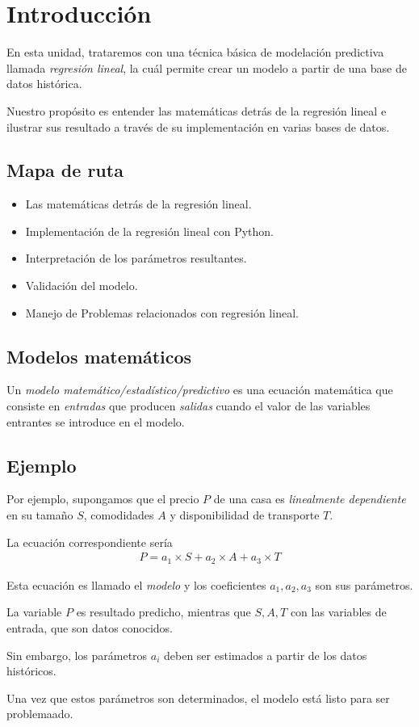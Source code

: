 \section{Introducción}

En esta unidad, trataremos con una técnica básica de modelación predictiva llamada \emph{regresión lineal}, la cuál permite crear un modelo a partir de una base de datos histórica.


Nuestro propósito es entender las matemáticas detrás de la regresión lineal e ilustrar sus resultado a través de su implementación en varias bases de datos.

\subsection{Mapa de ruta}
\begin{itemize}
	\item Las matemáticas detrás de la regresión lineal.
	\item Implementación de la regresión lineal con Python.
	\item Interpretación de los parámetros resultantes.
	\item Validación del modelo.
	\item Manejo de Problemas relacionados con regresión lineal.
\end{itemize}


\subsection{Modelos matemáticos}
Un \emph{modelo matemático/estadístico/predictivo} es una ecuación matemática que consiste en \emph{entradas} que producen \emph{salidas} cuando el valor de las variables entrantes se introduce en el modelo.

\subsection{Ejemplo}
Por ejemplo, supongamos que el precio $P$ de una casa es \emph{linealmente dependiente} en su tamaño $S$, comodidades $A$ y disponibilidad de transporte $T$.



La ecuación correspondiente sería
\begin{align}
	P = a_{1}\times S+ a_{2} \times A + a_{3} \times T
\end{align}



Esta ecuación es llamado el \emph{modelo} y los coeficientes $a_{1},a_{2},a_{3}$ son sus parámetros.



La variable $P$ es resultado predicho, mientras que $S,A,T$ con las variables de entrada, que son datos conocidos.


Sin embargo, los parámetros $a_{i}$ deben ser estimados a partir de los datos históricos.


Una vez que estos parámetros son determinados, el modelo está listo para ser problemaado.

